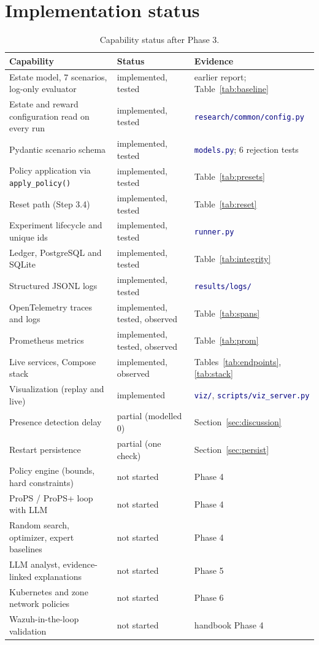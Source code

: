 \documentclass[11pt]{article}
\newcommand{\code}[1]{\texttt{\small #1}}
\newcommand{\file}[1]{\textcolor{navy}{\texttt{\small #1}}}
\begin{document}
\section{Implementation status}
\label{sec:status}
\begin{table}[h]
\centering
\caption{Capability status after Phase 3.}
\label{tab:status}
\small
\begin{tabular}{>{\RaggedRight\arraybackslash}p{5.4cm} p{2.6cm} >{\RaggedRight\arraybackslash}p{5.6cm}}
\toprule
\textbf{Capability} & \textbf{Status} & \textbf{Evidence}\\
\midrule
Estate model, 7 scenarios, log-only evaluator & implemented, tested & earlier report; Table~\ref{tab:baseline}\\
Estate and reward configuration read on every run & implemented, tested & \file{research/common/config.py}\\
Pydantic scenario schema & implemented, tested & \file{models.py}; 6 rejection tests\\
Policy application via \code{apply\_policy()} & implemented, tested & Table~\ref{tab:presets}\\
Reset path (Step 3.4) & implemented, tested & Table~\ref{tab:reset}\\
Experiment lifecycle and unique ids & implemented, tested & \file{runner.py}\\
Ledger, PostgreSQL and SQLite & implemented, tested & Table~\ref{tab:integrity}\\
Structured JSONL logs & implemented, tested & \file{results/logs/}\\
OpenTelemetry traces and logs & implemented, tested, observed & Table~\ref{tab:spans}\\
Prometheus metrics & implemented, tested, observed & Table~\ref{tab:prom}\\
Live services, Compose stack & implemented, observed & Tables~\ref{tab:endpoints}, \ref{tab:stack}\\
Visualization (replay and live) & implemented & \file{viz/}, \file{scripts/viz\_server.py}\\
\midrule
Presence detection delay & partial (modelled 0) & Section~\ref{sec:discussion}\\
Restart persistence & partial (one check) & Section~\ref{sec:persist}\\
\midrule
Policy engine (bounds, hard constraints) & not started & Phase 4\\
ProPS / ProPS+ loop with LLM & not started & Phase 4\\
Random search, optimizer, expert baselines & not started & Phase 4\\
LLM analyst, evidence-linked explanations & not started & Phase 5\\
Kubernetes and zone network policies & not started & Phase 6\\
Wazuh-in-the-loop validation & not started & handbook Phase 4\\
\bottomrule
\end{tabular}
\end{table}
\end{document}
